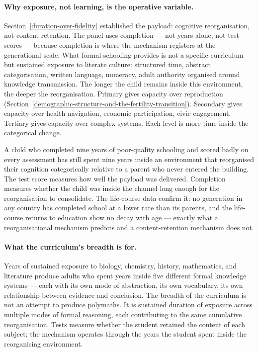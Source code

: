 \documentclass[12pt,letterpaper]{article}
\begin{document}
\paragraph{Why exposure, not learning, is the operative variable.}

Section~\ref{duration-over-fidelity} established the payload:
cognitive reorganisation, not content retention. The panel uses
completion --- not years alone, not test scores --- because completion
is where the mechanism registers at the generational scale. What
formal schooling provides is not a specific curriculum but sustained
exposure to literate culture: structured time, abstract categorisation,
written language, numeracy, adult authority organised around
knowledge transmission. The longer the child remains inside this
environment, the deeper the reorganisation. Primary gives capacity
over reproduction (Section~\ref{demographic-structure-and-the-fertility-transition}).
Secondary gives capacity over health navigation, economic
participation, civic engagement. Tertiary gives capacity over
complex systems. Each level is more time inside the categorical change.

A child who completed nine years of poor-quality schooling and scored
badly on every assessment has still spent nine years inside an
environment that reorganised their cognition categorically relative
to a parent who never entered the building. The test score measures
how well the payload was delivered. Completion measures whether the
child was inside the channel long enough for the reorganisation to
consolidate. The life-course data confirm it: no generation in any
country has completed school at a lower rate than its parents, and
the life-course returns to education show no decay with age ---
exactly what a reorganisational mechanism predicts and a
content-retention mechanism does not.

\paragraph{What the curriculum's breadth is for.}

Years of sustained exposure to biology, chemistry, history,
mathematics, and literature produce adults who spent years inside
five different formal knowledge systems --- each with its own mode of
abstraction, its own vocabulary, its own relationship between
evidence and conclusion. The breadth of the curriculum is not an
attempt to produce polymaths. It is sustained duration of exposure
across multiple modes of formal reasoning, each contributing to the
same cumulative reorganisation. Tests measure whether the student
retained the content of each subject; the mechanism operates through
the years the student spent inside the reorganising environment.
\end{document}
